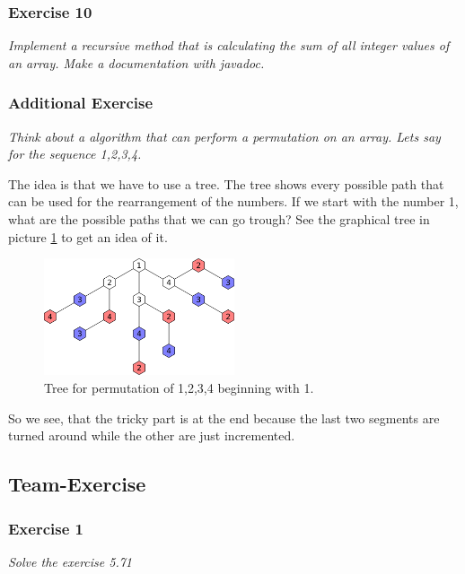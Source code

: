 

\subsubsection*{Exercise 10}
\textit{Implement a recursive method that is calculating the sum of
all integer values of an array. Make a documentation with javadoc.} \\



\subsubsection*{Additional Exercise}
\textit{Think about a algorithm that can perform a permutation on an array.
Lets say for the sequence 1,2,3,4.}

The idea is that we have to use a tree. The tree shows every possible path
that can be used for the rearrangement of the numbers. If we start with
the number 1, what are the possible paths that we can go trough? See the
graphical tree in picture \ref{pic:tree} to get an idea of it.

\begin{figure}[h!]
	\centering
	\includegraphics[width=0.5\textwidth]{tree.pdf}
	\caption{Tree for permutation of 1,2,3,4 beginning with 1.}
	\label{pic:tree}
\end{figure}

So we see, that the tricky part is at the end because the last two segments
are turned around while the other are just incremented.


\subsection{Team-Exercise}

\subsubsection{Exercise 1}
\textit{Solve the exercise 5.71} \\



